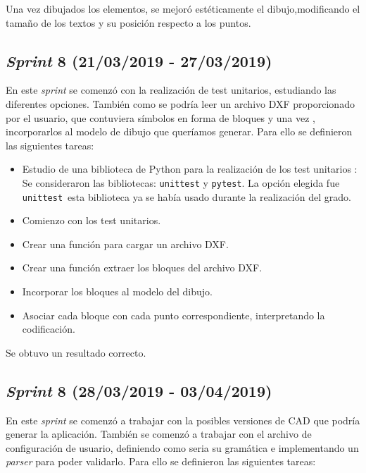 Una vez dibujados los elementos, se mejoró estéticamente el dibujo,modificando el tamaño de los textos y su posición respecto a los puntos.

\subsection{\emph{Sprint} 8 (21/03/2019 - 27/03/2019)}

En este \emph{sprint} se comenzó con la realización de test unitarios, estudiando las diferentes opciones. También como se podría  leer un archivo DXF proporcionado por el usuario, que contuviera símbolos en forma de bloques y una vez , incorporarlos al modelo de dibujo que queríamos generar. Para ello se definieron las siguientes tareas:

\begin{itemize}
\item Estudio de una biblioteca de Python para la realización de los test unitarios : Se consideraron las bibliotecas: \texttt{unittest}\cite{unittest} y \texttt{pytest}\cite{pytest}. La opción elegida fue \texttt{unittest}\, esta biblioteca ya se había usado durante la realización del grado.

\item Comienzo con los test unitarios.

\item Crear una función para cargar un archivo DXF.

\item Crear una función extraer los bloques del archivo DXF.

\item Incorporar los bloques al modelo del dibujo.

\item Asociar cada bloque con cada punto correspondiente, interpretando la codificación.

\end{itemize}

Se obtuvo un resultado correcto.
 
\subsection{\emph{Sprint} 8 (28/03/2019 - 03/04/2019)}

En este \emph{sprint} se comenzó a trabajar con la posibles versiones de CAD que podría generar la aplicación. También se comenzó a trabajar con el archivo de configuración de usuario, definiendo como seria su gramática e implementando un \emph{parser} para poder validarlo. Para ello se definieron las siguientes tareas:

